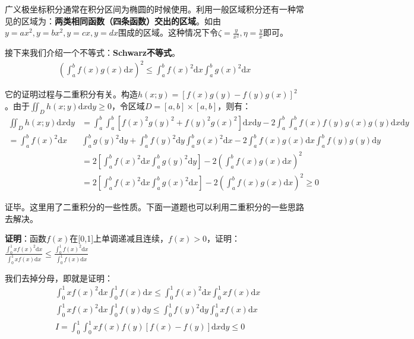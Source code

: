 \documentclass{ctexart}
\let\oldtextbf\textbf
\renewcommand{\textbf}[1]{\textcolor{brown!50!red}{\oldtextbf{#1}}}
\begin{document}
广义极坐标积分通常在积分区间为椭圆的时候使用。利用一般区域积分还有一种常见的区域为：\textbf{\color{brown!50!red}两类相同函数（四条函数）交出的区域}。如由$y=ax^2,y=bx^2,y=cx,y=dx$围成的区域。这种情况下令$\zeta=\frac{y}{x^2},\eta=\frac{y}{x}$即可。
\begin{tcolorbox}[
    colback=bac1,     %
    colframe=fra1,   %
    coltitle=white!80,    
    coltext=tex1,%
    title=补充知识：利用二重积分证明不等式,
    fonttitle=\bfseries,        %
    arc=2mm                     %
]
接下来我们介绍一个不等式：\textbf{\color{brown!50!red}Schwarz不等式}。
\begin{align*}
\left(\int_a^bf(x)g(x)\mathrm{d}x \right)^2\leq\int_a^bf(x)^2\mathrm{d}x\int_a^bg(x)^2\mathrm{d}x\tag{1-10}
\end{align*}

它的证明过程与二重积分有关。构造$h(x;y)=[f(x)g(y)-f(y)g(x)]^2$。由于$\iint_D h(x;y)\mathrm{d}x\mathrm{d}y\geq 0$，令区域$D=[a,b]\times[a,b]$，则有：
\begin{align*}
\iint_D h(x;y)\mathrm{d}x\mathrm{d}y&=\int_a^b\int_a^b[f(x)^2g(y)^2+f(y)^2g(x)^2]\mathrm{d}x\mathrm{d}y
-2\int_a^b\int_a^b f(x)f(y)g(x)g(y)\mathrm{d}x\mathrm{d}y\\
=\int_a^bf(x)^2\mathrm{d}x &\int_a^bg(y)^2\mathrm{d}y+ 
\int_a^bf(y)^2\mathrm{d}y\int_a^bg(x)^2\mathrm{d}x -2 \int_a^bf(x)g(x)\mathrm{d}x 
\int_a^bf(y)g(y)\mathrm{d}y\\
&=2\left[\int_a^bf(x)^2\mathrm{d}x\int_a^bg(y)^2\mathrm{d}y\right]-2\left(\int_a^b f(x)g(x)\mathrm{d}x 
\right)^2\\
&=2\left[\int_a^bf(x)^2\mathrm{d}x\int_a^bg(x)^2\mathrm{d}x\right]-2\left(\int_a^b f(x)g(x)\mathrm{d}x 
\right)^2\geq 0
\end{align*}

证毕。这里用了二重积分的一些性质。下面一道题也可以利用二重积分的一些思路去解决。
\end{tcolorbox}

\textbf{\color{brown!50!red}证明}：函数$f(x)$在[0,1]上单调递减且连续，$f(x)>0$，证明：$\frac{\int_0^1xf(x)^2\mathrm{d}x }{\int_0^1xf(x)\mathrm{d}x}\leq 
 \frac{\int_0^1f(x)^2\mathrm{d}x }{\int_0^1f(x)\mathrm{d}x}$

 我们去掉分母，即就是证明：
\begin{align*}
&\int_0^1xf(x)^2\mathrm{d}x \int_0^1f(x)\mathrm{d}x\leq 
\int_0^1f(x)^2\mathrm{d}x \int_0^1xf(x)\mathrm{d}x\\
&\int_0^1xf(x)^2\mathrm{d}x \int_0^1f(y)\mathrm{d}y\leq 
\int_0^1f(y)^2\mathrm{d}y \int_0^1xf(x)\mathrm{d}x\\
&I=\int_0^1\int_0^1xf(x)f(y)[f(x)-f(y)]\mathrm{d}x\mathrm{d}y\leq0\tag{a}
\end{align*}
\end{document}
